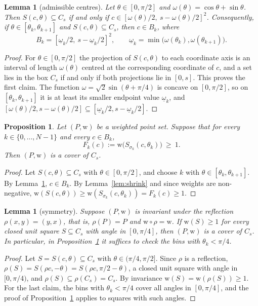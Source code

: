 \documentclass[11pt]{amsart}
\newtheorem{lemma}[theorem]{Lemma}
\newtheorem{proposition}[theorem]{Proposition}
\theoremstyle{definition}
\theoremstyle{remark}
\newcommand{\Cs}{C_s}
\newcommand{\wt}{\mathrm{w}}
\newcommand{\om}{\underline{\omega}}
\begin{document}
\begin{lemma}[admissible centres]\label{lem:centres}
Let $\theta\in[0,\pi/2]$ and $\omega(\theta)=\cos\theta+\sin\theta$. Then $S(c,\theta)\subseteq\Cs$ if and only if $c\in[\omega(\theta)/2,\ s-\omega(\theta)/2]^2$. Consequently, if $\theta\in[\theta_k,\theta_{k+1}]$ and $S(c,\theta)\subseteq\Cs$, then $c\in B_k$, where
\[
  B_k=[\om_k/2,\ s-\om_k/2]^2,\qquad \om_k=\min\bigl(\omega(\theta_k),\omega(\theta_{k+1})\bigr).
\]
\end{lemma}

\begin{proof}
For $\theta\in[0,\pi/2]$ the projection of $S(c,\theta)$ to each coordinate axis is an interval of length $\omega(\theta)$ centred at the corresponding coordinate of $c$, and a set lies in the box $\Cs$ if and only if both projections lie in $[0,s]$. This proves the first claim. The function $\omega=\sqrt2\sin(\theta+\pi/4)$ is concave on $[0,\pi/2]$, so on $[\theta_k,\theta_{k+1}]$ it is at least its smaller endpoint value $\om_k$, and $[\omega(\theta)/2,s-\omega(\theta)/2]\subseteq[\om_k/2,s-\om_k/2]$.
\end{proof}

\begin{proposition}\label{prop:finite}
Let $(P,\wt)$ be a weighted point set. Suppose that for every $k\in\{0,\dots,N-1\}$ and every $c\in B_k$,
\[
  F_k(c) := \wt\bigl(S_{\sigma_k}(c,\theta_k)\bigr)\ \ge\ 1 .
\]
Then $(P,\wt)$ is a cover of $\Cs$.
\end{proposition}

\begin{proof}
Let $S(c,\theta)\subseteq\Cs$ with $\theta\in[0,\pi/2]$, and choose $k$ with $\theta\in[\theta_k,\theta_{k+1}]$. By Lemma~\ref{lem:centres}, $c\in B_k$. By Lemma~\ref{lem:shrink} and since weights are non-negative, $\wt(S(c,\theta))\ge\wt(S_{\sigma_k}(c,\theta_k))=F_k(c)\ge1$.
\end{proof}

\begin{lemma}[symmetry]\label{lem:sym}
Suppose $(P,\wt)$ is invariant under the reflection $\rho(x,y)=(y,x)$, that is, $\rho(P)=P$ and $\wt\circ\rho=\wt$. If $\wt(S)\ge1$ for every closed unit square $S\subseteq\Cs$ with angle in $[0,\pi/4]$, then $(P,\wt)$ is a cover of $\Cs$. In particular, in Proposition~\ref{prop:finite} it suffices to check the bins with $\theta_k<\pi/4$.
\end{lemma}

\begin{proof}
Let $S=S(c,\theta)\subseteq\Cs$ with $\theta\in(\pi/4,\pi/2]$. Since $\rho$ is a reflection, $\rho(S)=S(\rho c,-\theta)=S(\rho c,\pi/2-\theta)$, a closed unit square with angle in $[0,\pi/4)$, and $\rho(S)\subseteq\rho(\Cs)=\Cs$. By invariance $\wt(S)=\wt(\rho(S))\ge1$. For the last claim, the bins with $\theta_k<\pi/4$ cover all angles in $[0,\pi/4]$, and the proof of Proposition~\ref{prop:finite} applies to squares with such angles.
\end{proof}
\end{document}
